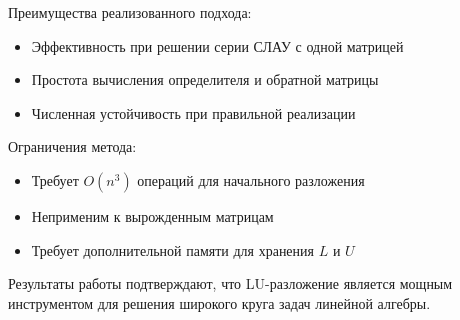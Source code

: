 Преимущества реализованного подхода:
\begin{itemize}
\item Эффективность при решении серии СЛАУ с одной матрицей
\item Простота вычисления определителя и обратной матрицы
\item Численная устойчивость при правильной реализации
\end{itemize}

Ограничения метода:
\begin{itemize}
\item Требует $O(n^3)$ операций для начального разложения
\item Неприменим к вырожденным матрицам
\item Требует дополнительной памяти для хранения $L$ и $U$
\end{itemize}

Результаты работы подтверждают, что LU-разложение является мощным инструментом 
для решения широкого круга задач линейной алгебры.

\pagebreak
